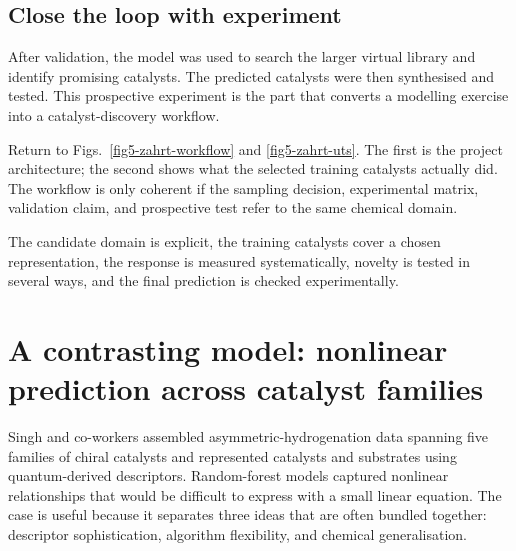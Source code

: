 \subsection{Close the loop with experiment}

After validation, the model was used to search the larger virtual library and identify promising catalysts.
The predicted catalysts were then synthesised and tested.
This prospective experiment is the part that converts a modelling exercise into a catalyst-discovery workflow.

Return to Figs.~\ref{fig5-zahrt-workflow} and \ref{fig5-zahrt-uts}. The first is the project architecture; the second shows what the selected training catalysts actually did. The workflow is only coherent if the sampling decision, experimental matrix, validation claim, and prospective test refer to the same chemical domain.


\begin{conceptbox}
  The candidate domain is explicit, the training catalysts cover a chosen representation, the response is measured systematically, novelty is tested in several ways, and the final prediction is checked experimentally.
\end{conceptbox}

\section{A contrasting model: nonlinear prediction across catalyst families}

Singh and co-workers assembled asymmetric-hydrogenation data spanning five families of chiral catalysts and represented catalysts and substrates using quantum-derived descriptors.
Random-forest models captured nonlinear relationships that would be difficult to express with a small linear equation.
The case is useful because it separates three ideas that are often bundled together: descriptor sophistication, algorithm flexibility, and chemical generalisation.

